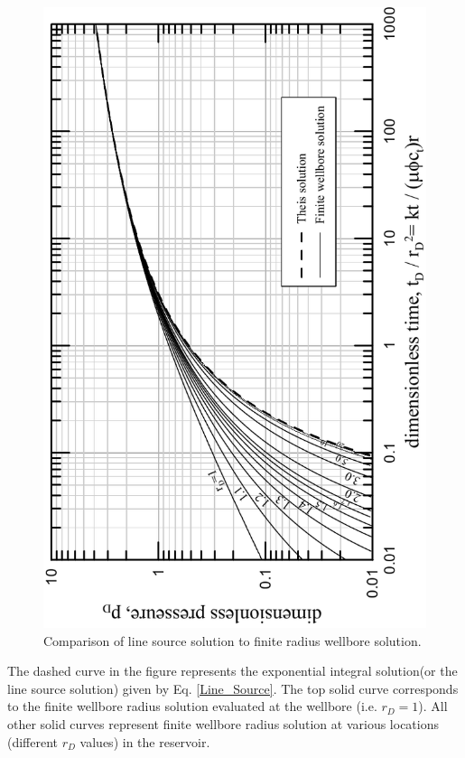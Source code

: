 \documentclass{llncs}
\numberwithin{equation}{section}
\numberwithin{figure}{section}
\numberwithin{table}{section}
\begin{document}
    \begin{figure}
        \begin{center}
        \includegraphics[scale=1]{Line_Finite_Comp.pdf}
        \caption{Comparison of line source solution to finite radius wellbore solution\cite{Mueller_1965_1}.}
        \end{center}
        \label{Line_Finite_Comp}
    \end{figure}    
    
    The dashed curve in the figure represents the exponential integral solution(or the line source solution) given by Eq. \ref{Line_Source}. The top solid curve corresponds to the finite wellbore radius solution evaluated at the wellbore (i.e. $r_D=1$). All other solid curves represent finite wellbore radius solution at various locations (different $r_{D}$ values) in the reservoir.
    
\end{document}
